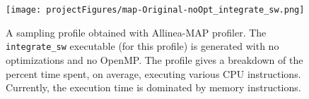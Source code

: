 \documentclass{softwaremanual}
\begin{document}
\begin{figure}
\begin{center}
\texttt{[image: projectFigures/map-Original-noOpt\_integrate\_sw.png]}
\caption{A sampling profile obtained with Allinea-MAP profiler. The \texttt{integrate\_sw} executable (for this profile) is generated with no optimizations and no OpenMP. The profile gives a breakdown of the percent time spent, on average, executing various CPU instructions. Currently, the execution time is dominated by memory instructions.}\label{fig:OrignalMAP}
\end{center}
\end{figure}
%
%
%
%
\end{document}
